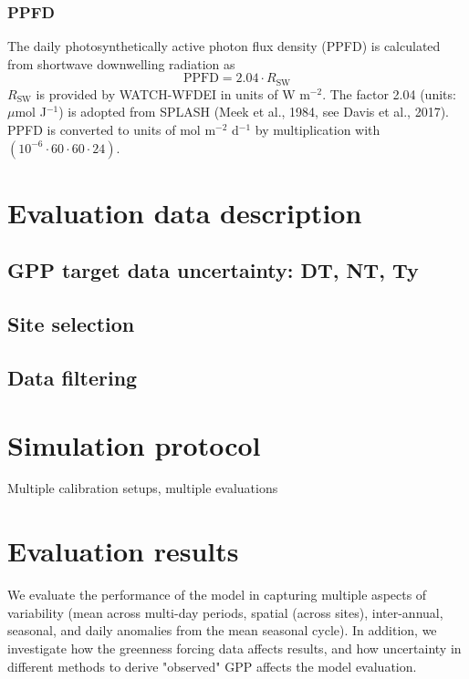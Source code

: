 \documentclass{myreport}
\begin{document}
\subsubsection{PPFD}
The daily photosynthetically active photon flux density (PPFD) is calculated from shortwave downwelling radiation as 
\begin{equation}
    \text{PPFD} = 2.04 \cdot R_{\text{SW}} 
\end{equation}
$R_{\text{SW}}$ is provided by WATCH-WFDEI in units of W m$^{-2}$. The factor 2.04 (units: $\mu$mol J$^{-1}$) is adopted from SPLASH (Meek et al., 1984, see Davis et al., 2017). PPFD is converted to units of mol m$^{-2}$ d$^{-1}$ by multiplication with $(10^{-6} \cdot 60 \cdot 60 \cdot 24)$.

\section{Evaluation data description}

\subsection{GPP target data uncertainty: DT, NT, Ty}

\subsection{Site selection}

\subsection{Data filtering}


\section{Simulation protocol}

Multiple calibration setups, multiple evaluations

\section{Evaluation results}

We evaluate the performance of the model in capturing multiple aspects of variability (mean across multi-day periods, spatial (across sites), inter-annual, seasonal, and daily anomalies from the mean seasonal cycle). In addition, we investigate how the greenness forcing data affects results, and how uncertainty in different methods to derive "observed" GPP affects the model evaluation.
\end{document}
